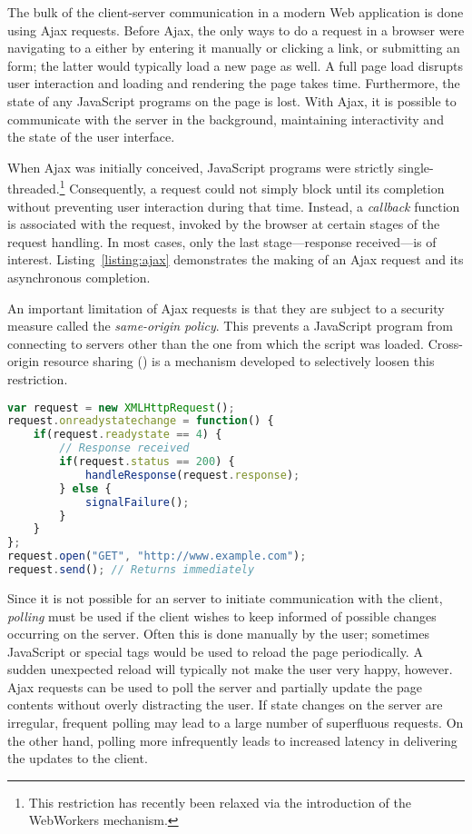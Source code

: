 The bulk of the client-server communication in a modern Web application is done using Ajax requests. Before Ajax, the only ways to do a  request in a browser were navigating to a  either by entering it manually or clicking a link, or submitting an  form; the latter would typically load a new page as well. A full page load disrupts user interaction and loading and rendering the page takes time. Furthermore, the state of any JavaScript programs on the page is lost. With Ajax, it is possible to communicate with the server in the background, maintaining interactivity and the state of the user interface. 

When Ajax was initially conceived, JavaScript programs were strictly single-threaded.\footnote{This restriction has recently been relaxed via the introduction of the WebWorkers mechanism.} Consequently, a request could not simply block until its completion without preventing user interaction during that time. Instead, a \emph{callback} function is associated with the request, invoked by the browser at certain stages of the request handling. In most cases, only the last stage---response received---is of interest. Listing~\ref{listing:ajax} demonstrates the making of an Ajax request and its asynchronous completion.

An important limitation of Ajax requests is that they are subject to a security measure called the \emph{same-origin policy}. This prevents a JavaScript program from connecting to servers other than the one from which the script was loaded. Cross-origin resource sharing () is a mechanism developed to selectively loosen this restriction.

\begin{code}
\begin{lstlisting}[language=JavaScript,caption=Making an Ajax request.\label{listing:ajax}]
var request = new XMLHttpRequest();
request.onreadystatechange = function() {
    if(request.readystate == 4) {
        // Response received
        if(request.status == 200) {
            handleResponse(request.response);
        } else {
            signalFailure();
        }
    }
};
request.open("GET", "http://www.example.com");
request.send(); // Returns immediately
\end{lstlisting}
\end{code}

Since it is not possible for an  server to initiate communication with the client, \emph{polling} must be used if the client wishes to keep informed of possible changes occurring on the server. Often this is done manually by the user; sometimes JavaScript or special  tags would be used to reload the page periodically. A sudden unexpected reload will typically not make the user very happy, however. Ajax requests can be used to poll the server and partially update the page contents without overly distracting the user. If state changes on the server are irregular, frequent polling may lead to a large number of superfluous requests. On the other hand, polling more infrequently leads to increased latency in delivering the updates to the client.

